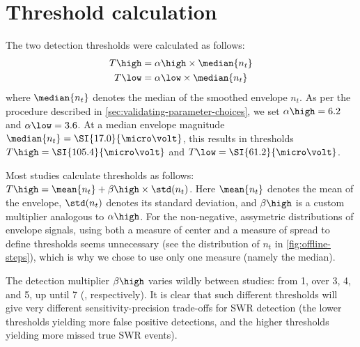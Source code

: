 \section{Threshold calculation}

The two detection thresholds were calculated as follows:
\begin{align}
\label{eq:thresholds-symbolic}
T\high &= \alpha\high \times \median{n_t} \\
T\low  &= \alpha\low  \times \median{n_t}
\end{align}
%
where $\median{n_t}$ denotes the median of the smoothed envelope $n_t$. As per the procedure described in \cref{sec:validating-parameter-choices}, we set $\alpha\high = 6.2$ and $\alpha\low = 3.6$. At a median envelope magnitude $\median{n_t} = \SI{17.0}{\micro\volt}$, this results in thresholds $T\high = \SI{105.4}{\micro\volt}$ and $T\low = \SI{61.2}{\micro\volt}$.

Most studies calculate thresholds as follows: $T\high = \mean{n_t} + \beta\high \times \std(n_t)$. Here $\mean{n_t}$ denotes the mean of the envelope, $\std(n_t)$ denotes its standard deviation, and $\beta\high$ is a custom multiplier analogous to $\alpha\high$. For the non-negative, assymetric distributions of envelope signals, using both a measure of center and a measure of spread to define thresholds seems unnecessary (see the distribution of $n_t$ in \cref{fig:offline-steps}), which is why we chose to use only one measure (namely the median).

The detection multiplier $\beta\high$ varies wildly between studies: from 1, over 3, 4, and 5, up until 7 (\cite{Csicsvari2000,Dutta2018,Behrens2005,Sadowski2016,Nadasdy1999}, respectively).\footnotemark{} It is clear that such different thresholds will give very different sensitivity-precision trade-offs for SWR detection (the lower thresholds yielding more false positive detections, and the higher thresholds yielding more missed true SWR events).


